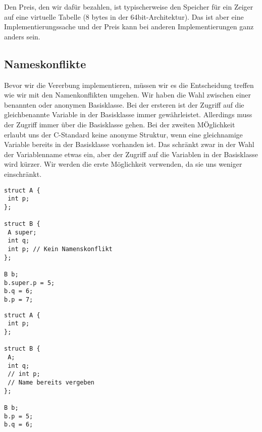 \documentclass{article}
\begin{document}
Den Preis, den wir dafür bezahlen, ist typischerweise den Speicher für ein Zeiger auf eine virtuelle Tabelle (8 bytes in der 64bit-Architektur).
Das ist aber eine Implementierungssache und der Preis kann bei anderen Implementierungen ganz anders sein.


\subsection{Nameskonflikte}

Bevor wir die Vererbung implementieren, müssen wir es die Entscheidung treffen wie wir mit den Namenkonflikten umgehen.
Wir haben die Wahl zwischen einer benannten oder anonymen Basisklasse.
Bei der ersteren ist der Zugriff auf die gleichbenannte Variable in der Basisklasse immer gewährleistet.
Allerdings muss der Zugriff immer über die Basisklasse gehen.
Bei der zweiten MÖglichkeit erlaubt uns der C-Standard keine anonyme Struktur, wenn eine gleichnamige Variable bereits in der Basisklasse vorhanden ist.
Das schränkt zwar in der Wahl der Variablenname etwas ein, aber der Zugriff auf die Variablen in der Basisklasse wird kürzer.
Wir werden die erste Möglichkeit verwenden, da sie uns weniger einschränkt.

\noindent\begin{minipage}{.45\textwidth}
\begin{verbatim}
struct A {
 int p;
};

struct B {
 A super;
 int q;
 int p; // Kein Namenskonflikt
};

B b;
b.super.p = 5;
b.q = 6;
b.p = 7;
\end{verbatim}
\end{minipage}\hfill
\begin{minipage}{.45\textwidth}
\begin{verbatim}
struct A {
 int p;
};

struct B {
 A;
 int q;
 // int p; 
 // Name bereits vergeben
};

B b;
b.p = 5;
b.q = 6;
\end{verbatim}
\end{minipage}









\end{document}
